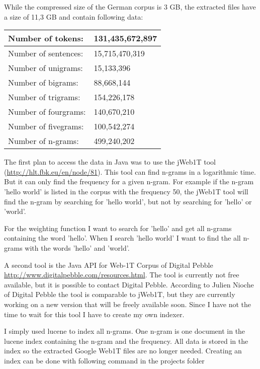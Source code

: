 \documentclass[11pt, accentcolor=tud9b, nochapname]{tudexercise}
\begin{document}
While the compressed size of the German corpus is 3 GB, the extracted
files have a size of 11,3 GB and contain following data:

\vspace{10pt}
\begin{tabular}{l | l}
  \hline
  Number of tokens: & 131,435,672,897 \\ \hline
  Number of sentences: & 15,715,470,319 \\ \hline
  Number of unigrams: & 15,133,396 \\ \hline
  Number of bigrams: & 88,668,144 \\ \hline
  Number of trigrams: & 154,226,178 \\ \hline
  Number of fourgrams: & 140,670,210 \\ \hline
  Number of fivegrams: & 100,542,274 \\ \hline
  Number of n-grams: & 499,240,202 \\ \hline
\end{tabular}
\vspace{10pt}

The first plan to access the data in Java was to use the jWeb1T tool
(\url{http://hlt.fbk.eu/en/node/81}). This tool can find n-grams in a
logarithmic time. But it can only find the frequency for a given
n-gram. For example if the n-gram 'hello world' is listed in the
corpus with the frequency 50, the jWeb1T tool will find the n-gram by
searching for 'hello world', but not by searching for 'hello' or
'world'.

For the weighting function I want to search for 'hello' and get all
n-grams containing the word 'hello'. When I search 'hello world' I
want to find the all n-grams with the words 'hello' and 'world'.

A second tool is the Java API for Web-1T Corpus of Digital Pebble
\url{http://www.digitalpebble.com/resources.html}. The tool is
currently not free available, but it is possible to contact Digital
Pebble. According to Julien Nioche of Digital Pebble the tool is
comparable to jWeb1T, but they are currently working on a new version
that will be freely available soon. Since I have not the time to wait
for this tool I have to create my own indexer.

I simply used lucene to index all n-grams. One n-gram is one document
in the lucene index containing the n-gram and the frequency. All data
is stored in the index so the extracted Google Web1T files are no
longer needed. Creating an index can be done with following command in
the projects folder
\end{document}

